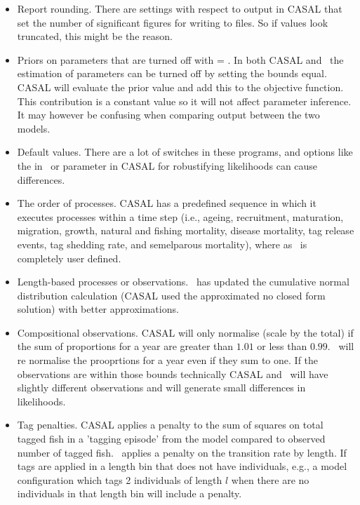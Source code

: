 \begin{itemize}
	\item Report rounding. There are settings with respect to output in CASAL that set the number of significant figures for writing to files. So if values look truncated, this might be the reason.

	
	\item Priors on parameters that are turned off with  = . In both CASAL and \CNAME\ the estimation of parameters can be turned off by setting the bounds equal. CASAL will evaluate the prior value and add this to the objective function.  This contribution is a constant value so it will not affect parameter inference. It may however be confusing when comparing output between the two models.

	\item Default values. There are a lot of switches in these programs, and options like the  in \CNAME\ or  parameter in CASAL for robustifying likelihoods can cause differences.

	\item The order of processes. CASAL has a predefined sequence in which it executes processes within a time step (i.e., ageing, recruitment, maturation, migration, growth, natural and fishing mortality, disease mortality, tag release events, tag shedding rate, and semelparous mortality), where as \CNAME\ is completely user defined.

	\item Length-based processes or observations. \CNAME\ has updated the cumulative normal distribution calculation (CASAL used the approximated no closed form solution) with better approximations.

	\item Compositional observations. CASAL will only normalise (scale by the total) if the sum of proportions for a year are greater than \(1.01\) or less than \(0.99\). \CNAME\ will re normalise the prooprtions for a year even if they sum to one. If the observations are within those bounds technically CASAL and \CNAME\ will have slightly different observations and will generate small differences in likelihoods.

	\item Tag penalties. CASAL applies a penalty to the sum of squares on total tagged fish in a 'tagging episode' from the model compared to observed number of tagged fish. \CNAME\ applies a penalty on the transition rate by length. If tags are applied in a length bin that does not have individuals, e.g., a model configuration which tags 2 individuals of length $l$ when there are no individuals in that length bin will include a penalty.
\end{itemize}

